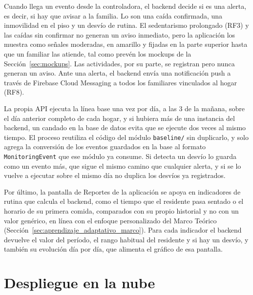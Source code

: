 Cuando llega un evento desde la controladora, el backend decide si es una alerta, es decir, si hay que avisar a la familia.
Lo son una caída confirmada, una inmovilidad en el piso y un desvío de rutina.
El sedentarismo prolongado (RF3) y las caídas sin confirmar no generan un aviso inmediato, pero la aplicación los muestra como señales moderadas, en amarillo y fijadas en la parte superior hasta que un familiar las atiende, tal como prevén los mockups de la Sección~\ref{sec:mockups}.
Las actividades, por su parte, se registran pero nunca generan un aviso.
Ante una alerta, el backend envía una notificación push a través de Firebase Cloud Messaging a todos los familiares vinculados al hogar (RF8).

La propia API ejecuta la línea base una vez por día, a las 3 de la mañana, sobre el día anterior completo de cada hogar, y si hubiera más de una instancia del backend, un candado en la base de datos evita que se ejecute dos veces al mismo tiempo.
El proceso reutiliza el código del módulo \texttt{baseline/} sin duplicarlo, y solo agrega la conversión de los eventos guardados en la base al formato \texttt{MonitoringEvent} que ese módulo ya consume.
Si detecta un desvío lo guarda como un evento más, que sigue el mismo camino que cualquier alerta, y si se lo vuelve a ejecutar sobre el mismo día no duplica los desvíos ya registrados.

Por último, la pantalla de Reportes de la aplicación se apoya en indicadores de rutina que calcula el backend, como el tiempo que el residente pasa sentado o el horario de su primera comida, comparados con su propio historial y no con un valor genérico, en línea con el enfoque personalizado del Marco Teórico (Sección~\ref{sec:aprendizaje_adaptativo_marco}).
Para cada indicador el backend devuelve el valor del período, el rango habitual del residente y si hay un desvío, y también su evolución día por día, que alimenta el gráfico de esa pantalla.
\FloatBarrier

\section{Despliegue en la nube}
\label{sec:despliegue}

